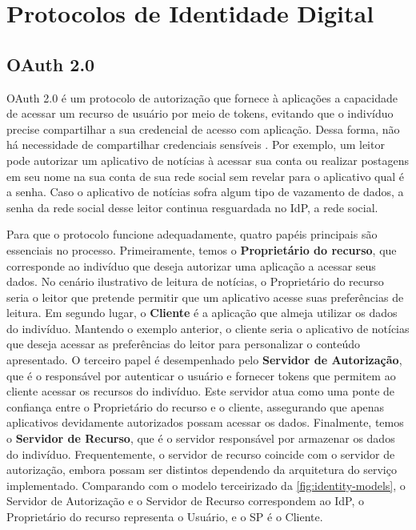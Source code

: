 \section{Protocolos de Identidade Digital}\label{subsection:protocolos}

\subsection{OAuth 2.0}\label{subsubsection:oauth}

OAuth 2.0 é um protocolo  de autorização que fornece à aplicações a capacidade de acessar um recurso de usuário por meio de tokens, evitando que o indivíduo precise compartilhar a sua credencial de acesso com aplicação. Dessa forma, não há necessidade de compartilhar credenciais sensíveis \cite{oauth}. Por exemplo, um leitor pode autorizar um aplicativo de notícias à acessar sua conta ou realizar postagens em seu nome na sua conta de sua rede social sem revelar para o aplicativo qual é a senha. Caso o aplicativo de notícias sofra algum tipo de vazamento de dados, a senha da rede social desse leitor continua resguardada no \acs{IdP}, a rede social.

Para que o protocolo funcione adequadamente, quatro papéis principais são essenciais no processo. Primeiramente, temos o \textbf{Proprietário do recurso}, que corresponde ao indivíduo que deseja autorizar uma aplicação a acessar seus dados. No cenário ilustrativo de leitura de notícias, o Proprietário do recurso seria o leitor que pretende permitir que um aplicativo acesse suas preferências de leitura. Em segundo lugar, o \textbf{Cliente} é a aplicação que almeja utilizar os dados do indivíduo. Mantendo o exemplo anterior, o cliente seria o aplicativo de notícias que deseja acessar as preferências do leitor para personalizar o conteúdo apresentado. O terceiro papel é desempenhado pelo \textbf{Servidor de Autorização}, que é o responsável por autenticar o usuário e fornecer tokens que permitem ao cliente acessar os recursos do indivíduo. Este servidor atua como uma ponte de confiança entre o Proprietário do recurso e o cliente, assegurando que apenas aplicativos devidamente autorizados possam acessar os dados. Finalmente, temos o \textbf{Servidor de Recurso}, que é o servidor responsável por armazenar os dados do indivíduo. Frequentemente, o servidor de recurso coincide com o servidor de autorização, embora possam ser distintos dependendo da arquitetura do serviço implementado. Comparando com o modelo terceirizado da \autoref{fig:identity-models}, o Servidor de Autorização e o Servidor de Recurso correspondem ao \acs{IdP}, o Proprietário do recurso representa o Usuário, e o \acs{SP} é o Cliente.

